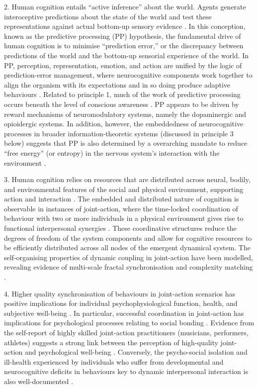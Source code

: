 \begin{CJK}{UTF8}{gbsn}
{2. Human cognition entails ``active inference'' \citep{Friston2010} about the world. Agents generate interoceptive predictions about the state of the world and test these representations against actual bottom-up sensory evidence \citep{Clark2013}.  In this conception, known as the predictive processing (PP) hypothesis, the fundamental drive of human cognition is to minimise ``prediction error,'' or the discrepancy between predictions of the world and the bottom-up sensorial experience of the world. In PP, perception, representation, emotion, and action are unified by the logic of prediction-error management, where neurocognitive components work together to align the organism with its expectations and in so doing produce adaptive behaviours \citep{Pezzulo2014}. Related to principle 1, much of the work of predictive processing occurs beneath the level of conscious awareness \citep{Frith2007,Clark2013}.
PP appears to be driven by reward mechanisms of neuromodulatory systems, namely the dopaminergic \citep{Schultz2016} and opioidergic \citep{Laurent2014} systems.  In addition, however, the embeddedness of neurocognitive processes in broader information-theoretic systems (discussed in principle 3 below) suggests that PP is also determined by a overarching mandate to reduce ``free energy'' (or entropy) in the nervous system's interaction with the environment \citep{Friston2010}.

3. Human cognition relies on resources that are distributed across neural, bodily, and environmental features of the social and physical environment, supporting action and interaction \citep{Hutchins1995,Kirsh1995,Smith2004}.  The embedded and distributed nature of cognition is observable in instances of joint-action, where the time-locked coordination of behaviour with two or more individuals in a physical environment gives rise to functional interpersonal synergies \citep{Riley2011,Coey2012}.  These coordinative structures reduce the degrees of freedom of the system components and allow for cognitive resources to be efficiently distributed across all nodes of the emergent dynamical system. The self-organising properties of dynamic coupling in joint-action have been modelled, revealing evidence of multi-scale fractal synchronisation and complexity matching \citep{Schmidt2011,Richardson2012}.

4. Higher quality synchronisation of behaviours in joint-action scenarios has positive implications for individual psychophysiological function, health, and subjective well-being \citep{Wheatley2012}.  In particular, successful coordination in joint-action has implications for psychological processes relating to social bonding \citep{Marsh2009,Launay2016}.  Evidence from the self-report of highly skilled joint-action practitioners (musicians, performers, athletes) suggests a strong link between the perception of high-quality joint-action and psychological well-being \citep{Jackson1995,Jackson1992}.  Conversely, the psycho-social isolation and ill-health experienced by individuals who suffer from developmental and neurocognitive deficits in behaviours key to dynamic interpersonal interaction is also well-documented \citep[e.g.][]{Blakemore2005,Baron-Cohen1991}.

}
\end{CJK}
